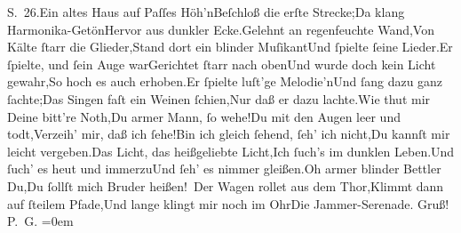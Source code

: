 {{{                           S. 26.}}}\label{K_L02928-1}\stanzaend{}\stanza{}Ein altes Haus auf Paſſes Höh’n\newverse{}Beſchloß die erſte Strecke;\newverse{}Da klang Harmonika-Getön\newverse{}Hervor aus dunkler Ecke.\stanzaend{}\stanza{}Gelehnt an regenfeuchte Wand,\newverse{}Von Kälte{ }ſtarr die Glieder,\newverse{}Stand dort ein blinder Muſikant\newverse{}Und{ }ſpielte{ }ſeine Lieder.\stanzaend{}\stanza{}Er{ }ſpielte, und{ }ſein Auge war\newverse{}Gerichtet{ }ſtarr nach oben\newverse{}Und wurde doch kein Licht gewahr,\newverse{}So hoch es auch erhoben.\stanzaend{}\stanza{}{\pb}Er{ }ſpielte luſt’ge Melodie’n\newverse{}Und{ }ſang dazu ganz{ }ſachte;\newverse{}Das Singen faſt ein Weinen{ }ſchien,\newverse{}Nur daß er dazu lachte.\stanzaend{}\stanza{}Wie thut mir Deine bitt’re Noth,\newverse{}Du armer Mann,{ }ſo wehe!\newverse{}Du mit den Augen leer und todt,\newverse{}Verzeih’ mir, daß ich{ }ſehe!\stanzaend{}\stanza{}Bin ich gleich{ }ſehend,{ }ſeh’ ich  nicht,\newverse{}Du kannſt mir leicht vergeben.\newverse{}Das Licht, das heißgeliebte Licht,\newverse{}Ich{ }ſuch’s im dunklen Leben.\stanzaend{}\stanza{}Und{ }ſuch’ es heut und immerzu\newverse{}Und{ }ſeh’ es nimmer gleißen.\newverse{}Oh armer blinder Bettler Du,\newverse{}Du{ }ſollſt mich Bruder heißen! {\dotssix}\stanzaend{}\stanza{}Der Wagen rollet aus dem Thor,\newverse{}Klimmt dann auf{ }ſteilem Pfade,\newverse{}Und lange klingt mir noch im Ohr\newverse{}Die Jammer-Serenade.\stanzaend{}
\pstart
           Gruß! {\\[\baselineskip]}\spacefill\mbox{P. G.}\pend
           \leftskip=0em{}\endnumbering{}  \newcommand{\dateiname}{L02928}\newcommand{\titel}{Paul Goldmann an Arthur Schnitzler, 28. 8. [1900]}\newcommand{\editorInnen}{Martin Anton Müller und Laura Untner}
